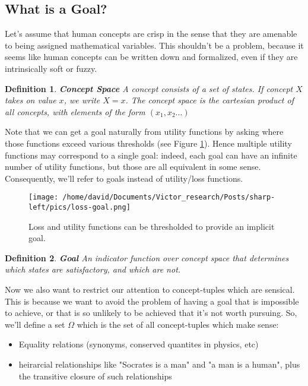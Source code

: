 \documentclass{article}
\newtheorem{definition}{Definition}
\newtheorem{assumption}{Assumption}
\begin{document}
\subsection{What is a Goal?}

Let's assume that human concepts are crisp in the sense that they are amenable to being assigned mathematical variables.
This shouldn't be a problem, because it seems like human concepts can be written down and formalized, even if they are intrinsically soft or fuzzy.

\begin{definition}{\textbf{Concept Space}}
    A concept consists of a set of states. If concept $X$ takes on value $x$, we write $X=x$.
    The concept space is the cartesian product of all concepts, with elements of the form $(x_1,x_2\dots)$
\end{definition}


Note that we can get a goal naturally from utility functions by asking where those functions exceed various thresholds (see Figure \ref{fig:loss-goal}). Hence multiple utility functions may correspond to a single goal: indeed, each goal can have an infinite number of utility functions, but those are all equivalent in some sense. Consequently, we'll refer to goals instead of utility/loss functions.

\begin{figure}[ht]
    \centering
    \texttt{[image: /home/david/Documents/Victor\_research/Posts/sharp-left/pics/loss-goal.png]} 
    \caption{Loss and utility functions can be thresholded to provide an implicit goal.}
    \label{fig:loss-goal} 
\end{figure}

\begin{definition}{\textbf{Goal}}
    An indicator function over concept space that determines which states are satisfactory, and which are not.
\end{definition}

Now we also want to restrict our attention to concept-tuples which are sensical. This is because we want to avoid the problem of having a goal that is impossible to achieve, or that is so unlikely to be achieved that it's not worth pursuing. So, we'll define a set $\Omega$ which is the set of all concept-tuples which make sense:
\begin{itemize}
    \item Equality relations (synonyms, conserved quantites in physics, etc)
    \item heirarcial relationships like "Socrates is a man" and "a man is a human", plus the transitive closure of such relationships
\end{itemize}
\end{document}
